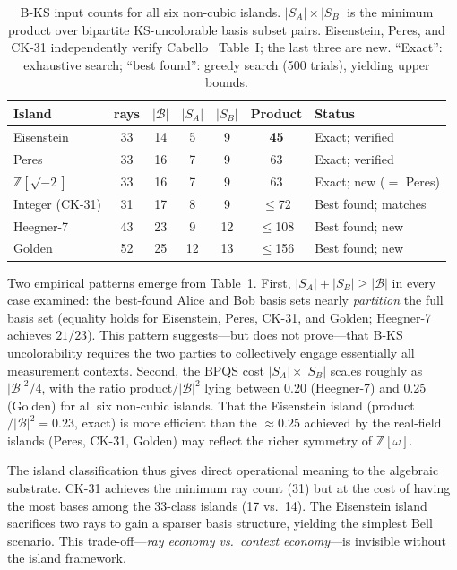 \documentclass[12pt,a4paper]{article}
\newcommand{\Z}{\mathbb{Z}}
\begin{document}
\begin{table}[ht]
\centering
\caption{B-KS input counts for all six non-cubic islands. $|S_A| \times |S_B|$ is the minimum product over bipartite KS-uncolorable basis subset pairs. Eisenstein, Peres, and CK-31 independently verify Cabello~\cite{Cabello2025simplest} Table~I; the last three are new. ``Exact'': exhaustive search; ``best found'': greedy search (500 trials), yielding upper bounds.}
\label{tab:bpqs}
\begin{tabular}{lcccccl}
\toprule
Island & rays & $|\mathcal{B}|$ & $|S_A|$ & $|S_B|$ & Product & Status \\
\midrule
Eisenstein & 33 & 14 & 5 & 9 & \textbf{45} & Exact; verified \\
Peres & 33 & 16 & 7 & 9 & 63 & Exact; verified \\
$\Z[\sqrt{-2}]$ & 33 & 16 & 7 & 9 & 63 & Exact; new ($=$ Peres) \\
Integer (CK-31) & 31 & 17 & 8 & 9 & $\leq$72 & Best found; matches~\cite{Cabello2025simplest} \\
Heegner-7 & 43 & 23 & 9 & 12 & $\leq$108 & Best found; new \\
Golden & 52 & 25 & 12 & 13 & $\leq$156 & Best found; new \\
\bottomrule
\end{tabular}
\end{table}

\noindent Two empirical patterns emerge from Table~\ref{tab:bpqs}. First, $|S_A| + |S_B| \geq |\mathcal{B}|$ in every case examined: the best-found Alice and Bob basis sets nearly \emph{partition} the full basis set (equality holds for Eisenstein, Peres, CK-31, and Golden; Heegner-7 achieves $21/23$). This pattern suggests---but does not prove---that B-KS uncolorability requires the two parties to collectively engage essentially all measurement contexts. Second, the BPQS cost $|S_A| \times |S_B|$ scales roughly as $|\mathcal{B}|^2/4$, with the ratio product$/|\mathcal{B}|^2$ lying between 0.20 (Heegner-7) and 0.25 (Golden) for all six non-cubic islands. That the Eisenstein island (product$/|\mathcal{B}|^2 = 0.23$, exact) is more efficient than the $\approx 0.25$ achieved by the real-field islands (Peres, CK-31, Golden) may reflect the richer symmetry of $\Z[\omega]$.

The island classification thus gives direct operational meaning to the algebraic substrate. CK-31 achieves the minimum ray count (31) but at the cost of having the most bases among the 33-class islands (17 vs.\ 14). The Eisenstein island sacrifices two rays to gain a sparser basis structure, yielding the simplest Bell scenario. This trade-off---\emph{ray economy vs.\ context economy}---is invisible without the island framework.
\end{document}
